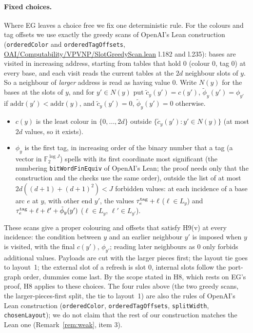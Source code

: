\documentclass[11pt]{article}
\theoremstyle{definition}
\theoremstyle{remark}
\newcommand{\F}{\mathbb F}
\newcommand{\src}[1]{\url{#1}}
\begin{document}
\paragraph{Fixed choices.} Where EG leaves a choice free we fix one deterministic rule. For the colours and tag offsets we use
exactly the greedy scans of OpenAI's Lean construction (\texttt{orderedColor} and \texttt{orderedTagOffsets},
\src{OAI/Computability/VPVNP/SlotGreedyScan.lean} l.182 and l.235): bases are visited in increasing address, starting from tables
that hold $0$ (colour $0$, tag $0$) at every base, and each visit reads the current tables at the $2d$ neighbour slots of $y$. So a
neighbour of \emph{larger} address is read as having value $0$. Write $N(y)$ for the bases at the slots of $y$, and for
$y'\in N(y)$ put $\tilde c_y(y')=c(y')$, $\tilde\phi_y(y')=\phi_{y'}$ if $\mathrm{addr}(y')<\mathrm{addr}(y)$, and
$\tilde c_y(y')=0$, $\tilde\phi_y(y')=0$ otherwise.
\begin{itemize}
\item[(R1)] $c(y)$ is the least colour in $\{0,\dots,2d\}$ outside $\{\tilde c_y(y'):y'\in N(y)\}$ (at most $2d$ values, so it exists).
\item[(R2)] $\phi_y$ is the first tag, in increasing order of the binary number that a tag (a vector in $\F_2^{\log J}$) spells
  with its first coordinate most significant (the numbering \texttt{bitWordFinEquiv} of OpenAI's Lean; the proof needs only that the
  construction and the checks use the same order), outside the list of at most
  $2d((d+1)+(d+1)^2)<J$ forbidden values: at each incidence of a base arc $e$ at $y$, with other end $y'$, the values
  $\tau^{\rm tag}_e+\ell$ ($\ell\in L_y$) and $\tau^{\rm tag}_e+\ell+\ell'+\tilde\phi_y(y')$ ($\ell\in L_y$, $\ell'\in L_{y'}$).
\end{itemize}
These scans give a proper colouring and offsets that satisfy H9(v) at every incidence: the condition between $y$ and an earlier
neighbour $y'$ is imposed when $y$ is visited, with the final $c(y')$, $\phi_{y'}$; reading later neighbours as $0$ only forbids
additional values. Payloads are cut with the larger pieces first; the layout tie goes to layout~1; the external slot of a refresh
is slot $0$, internal slots follow the port-graph order, dummies come last. By the scope stated in H8, which rests on EG's
proof, H8 applies to these choices. The four rules above (the two greedy scans, the larger-pieces-first split, the tie to layout~1)
are also the rules of OpenAI's Lean construction (\texttt{orderedColor}, \texttt{orderedTagOffsets}, \texttt{splitWidth},
\texttt{chosenLayout}); we do not claim that the rest of our construction matches the Lean one (Remark~\ref{rem:weak}, item 3).
\end{document}
